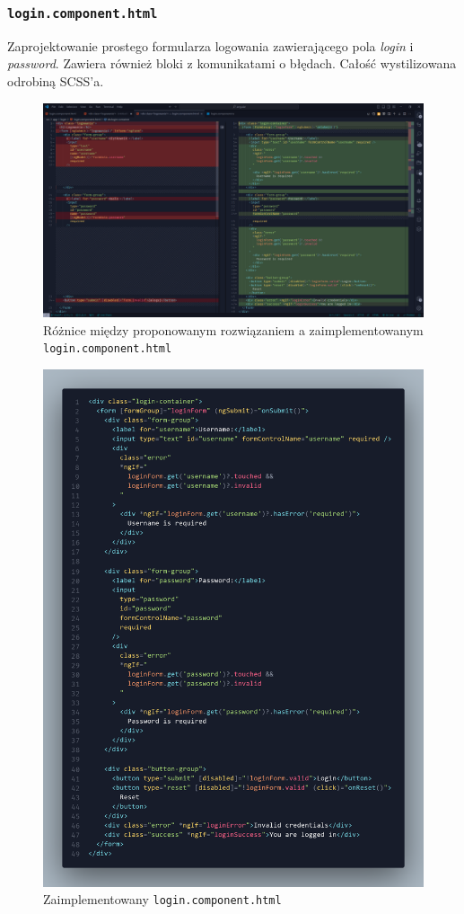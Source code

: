 \documentclass[12pt]{article}
\begin{document}
\subsubsection{\texttt{login.component.html}}
Zaprojektowanie prostego formularza logowania zawierającego pola \textit{login} i \textit{password}.
Zawiera również bloki z komunikatami o błędach. Całość wystilizowana odrobiną SCSS'a.
\begin{figure}[H]
  \centering
  \includegraphics[width=1\textwidth]{image-4.png}
  \caption{Różnice między proponowanym rozwiązaniem a zaimplementowanym \texttt{login.component.html}}
  \label{fig:image-4}
\end{figure}
\begin{figure}[H]
  \centering
  \includegraphics[width=1\textwidth]{image-5.png}
  \caption{Zaimplementowany \texttt{login.component.html}}
  \label{fig:image-5}
\end{figure}
\end{document}
